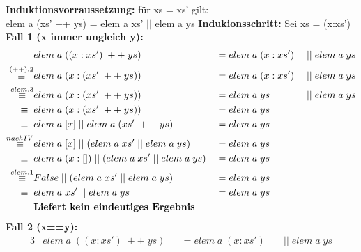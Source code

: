 \documentclass[11pt]{article}
\begin{document}
\begin{enumerate}
\begin{enumerate}
\vspace*{0.5cm}
\textbf{Induktionsvorraussetzung:} für xs = xs' gilt:\\
elem a (xs' ++ ys) = elem a xs' $||$ elem a ys
\newpage
\textbf{Indukionsschritt:} Sei xs = (x:xs')\\
\phantom{Krie}\textbf{Fall 1 (x immer ungleich y):}
\begin{alignat*}{3}
&elem\phantom{.}a\phantom{.}((x:xs')\phantom{.}++\phantom{.}ys)&&=elem\phantom{.}a\phantom{.}(x:xs')\phantom{.}&&||\phantom{.}elem\phantom{.}a\phantom{.}ys\\
\stackrel{(++).2}{\equiv}&elem\phantom{.}a\phantom{.}(x:(xs'\phantom{.}++\phantom{.}ys))&&=elem\phantom{.}a\phantom{.}(x:xs')\phantom{.}&&||\phantom{.}elem\phantom{.}a\phantom{.}ys\\
\stackrel{elem.3}{\equiv}&elem\phantom{.}a\phantom{.}(x:(xs'\phantom{.}++\phantom{.}ys))&&=elem\phantom{.}a\phantom{.}ys\phantom{.}&&||\phantom{.}elem\phantom{.}a\phantom{.}ys\\
\equiv\phantom{.}&elem\phantom{.}a\phantom{.}(x:(xs'\phantom{.}++\phantom{.}ys))&&=elem\phantom{.}a\phantom{.}ys&&\\
\equiv\phantom{.}&elem\phantom{.}a\phantom{.}[x]\phantom{.}||\phantom{.}elem\phantom{.}a\phantom{.}(xs'\phantom{.}++\phantom{.}ys)&&=elem\phantom{.}a\phantom{.}ys&&\\
\stackrel{nach IV}{\equiv}&elem\phantom{.}a\phantom{.}[x]\phantom{.}||\phantom{.}(elem\phantom{.}a\phantom{.}xs'\phantom{.}||\phantom{.}elem\phantom{.}a\phantom{.}ys)&&=elem\phantom{.}a\phantom{.}ys&&\\
\equiv\phantom{.}&elem\phantom{.}a\phantom{.}(x:[])\phantom{.}||\phantom{.}(elem\phantom{.}a\phantom{.}xs'\phantom{.}||\phantom{.}elem\phantom{.}a\phantom{.}ys)&&=elem\phantom{.}a\phantom{.}ys&&\\
\stackrel{elem.1}{\equiv}&False\phantom{.}||\phantom{.}(elem\phantom{.}a\phantom{.}xs'\phantom{.}||\phantom{.}elem\phantom{.}a\phantom{.}ys)&&=elem\phantom{.}a\phantom{.}ys&&\\
\equiv\phantom{.}&elem\phantom{.}a\phantom{.}xs'\phantom{.}||\phantom{.}elem\phantom{.}a\phantom{.}ys&&=elem\phantom{.}a\phantom{.}ys&&\\
&\text{\textbf{Liefert kein eindeutiges Ergebnis}}
\end{alignat*}
\newline
\phantom{Krie}\textbf{Fall 2 (x==y):}
\begin{alignat*}{3}
&elem\phantom{.}a\phantom{.}((x:xs')\phantom{.}++\phantom{.}ys)&&=elem\phantom{.}a\phantom{.}(x:xs')\phantom{.}&&||\phantom{.}elem\phantom{.}a\phantom{.}ys\\

\end{alignat*}
\end{enumerate}
\end{enumerate}
\end{document}

